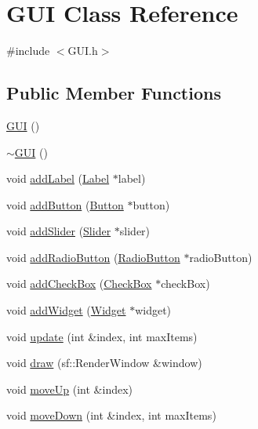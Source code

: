 \hypertarget{class_g_u_i}{}\section{G\+UI Class Reference}
\label{class_g_u_i}


{\ttfamily \#include $<$G\+U\+I.\+h$>$}

\subsection*{Public Member Functions}
\begin{DoxyCompactItemize}
\item 
\mbox{\hyperlink{class_g_u_i_a8cbb3140b7d3c9d8e942d6ce6b60a0e8}{G\+UI}} ()
\item 
\mbox{\hyperlink{class_g_u_i_ac9cae2328dcb5d83bdfaeca49a2eb695}{$\sim$\+G\+UI}} ()
\item 
void \mbox{\hyperlink{class_g_u_i_a350e1e71e62bbb7240c7b1c65adeacf2}{add\+Label}} (\mbox{\hyperlink{class_label}{Label}} $\ast$label)
\item 
void \mbox{\hyperlink{class_g_u_i_a2d2a03583ec32ec72c29f77a85e38a60}{add\+Button}} (\mbox{\hyperlink{class_button}{Button}} $\ast$button)
\item 
void \mbox{\hyperlink{class_g_u_i_a8fdf8aacbebf66678dc32ab8fb75e35e}{add\+Slider}} (\mbox{\hyperlink{class_slider}{Slider}} $\ast$slider)
\item 
void \mbox{\hyperlink{class_g_u_i_ab593b74382f085b7d24f6da0646ed534}{add\+Radio\+Button}} (\mbox{\hyperlink{class_radio_button}{Radio\+Button}} $\ast$radio\+Button)
\item 
void \mbox{\hyperlink{class_g_u_i_a9c003774928d3d6febd78713a0ef5943}{add\+Check\+Box}} (\mbox{\hyperlink{class_check_box}{Check\+Box}} $\ast$check\+Box)
\item 
void \mbox{\hyperlink{class_g_u_i_a658d7dd36cd27eeedaedecc98ba7e7b4}{add\+Widget}} (\mbox{\hyperlink{class_widget}{Widget}} $\ast$widget)
\item 
void \mbox{\hyperlink{class_g_u_i_a055693c460f0441b193681e7f9d52766}{update}} (int \&index, int max\+Items)
\item 
void \mbox{\hyperlink{class_g_u_i_a8cea06ea8b346be3b2b261fbec5dee7c}{draw}} (sf\+::\+Render\+Window \&window)
\item 
void \mbox{\hyperlink{class_g_u_i_a4cc91f9f39059fbe3b4b37ced715854c}{move\+Up}} (int \&index)
\item 
void \mbox{\hyperlink{class_g_u_i_a49fba205ba96ff33daa0968be55824f8}{move\+Down}} (int \&index, int max\+Items)

\end{DoxyCompactItemize}
